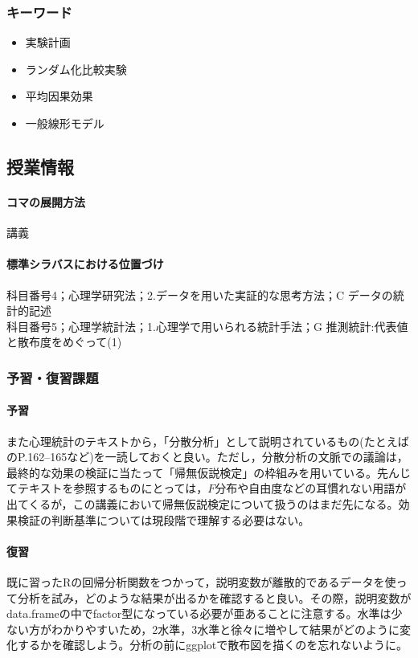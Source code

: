 \subsubsection{キーワード}
\begin{itemize}
	\item 実験計画
	\item ランダム化比較実験
	\item 平均因果効果
	\item 一般線形モデル
\end{itemize}
\subsection{授業情報}
\paragraph{コマの展開方法}
講義
\paragraph{標準シラバスにおける位置づけ}
科目番号4；心理学研究法；2.データを用いた実証的な思考方法；C データの統計的記述\\
科目番号5；心理学統計法；1.心理学で用いられる統計手法；G 推測統計:代表値と散布度をめぐって(1)
\subsubsection{予習・復習課題}
\paragraph{予習}
また心理統計のテキストから，「分散分析」として説明されているもの(たとえば\textcite{Yamada2004}のP.162--165など)を一読しておくと良い。ただし，分散分析の文脈での議論は，最終的な効果の検証に当たって「帰無仮説検定」の枠組みを用いている。先んじてテキストを参照するものにとっては，$F分布$や自由度などの耳慣れない用語が出てくるが，この講義において帰無仮説検定について扱うのはまだ先になる。効果検証の判断基準については現段階で理解する必要はない。
\paragraph{復習}
既に習ったRの回帰分析関数をつかって，説明変数が離散的であるデータを使って分析を試み，どのような結果が出るかを確認すると良い。その際，説明変数がdata.frameの中でfactor型になっている必要が亜あることに注意する。水準は少ない方がわかりやすいため，2水準，3水準と徐々に増やして結果がどのように変化するかを確認しよう。分析の前にggplotで散布図を描くのを忘れないように。
